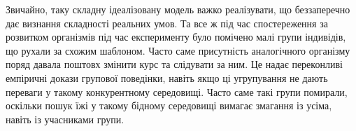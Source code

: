 Звичайно, таку складну ідеалізовану модель важко реалізувати,
що беззаперечно дає визнання складності реальних умов.
Та все ж під час спостереження за розвитком організмів під час експерименту
було помічено малі групи індивідів, що рухали за схожим шаблоном.
Часто саме присутність аналогічного організму поряд
давала поштовх змінити курс та слідувати за ним.
Це надає переконливі емпіричні докази групової поведінки,
навіть якщо ці угрупування не дають переваги у такому конкурентному
середовищі.
Часто саме такі групи помирали, оскільки пошук їжі у такому бідному середовищі
вимагає змагання із усіма, навіть із учасниками групи.












